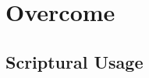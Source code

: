 \section{Overcome}
	\label{OVERCOME}
	




	


\subsection{Scriptural Usage} %
	\label{OVERCOME-SCRIPTURES}

